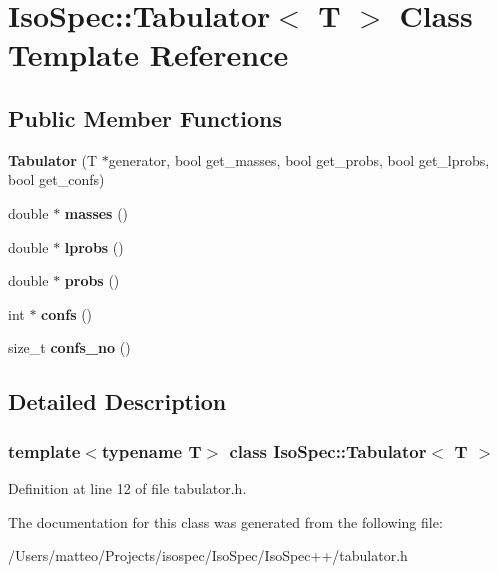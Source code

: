 \hypertarget{class_iso_spec_1_1_tabulator}{}\section{Iso\+Spec\+:\+:Tabulator$<$ T $>$ Class Template Reference}
\label{class_iso_spec_1_1_tabulator}
\subsection*{Public Member Functions}
\begin{DoxyCompactItemize}
\item 
\mbox{\label{class_iso_spec_1_1_tabulator_a57acb4ba7687ac95916c00fd9cd4f4c7}} 
{\bfseries Tabulator} (T $\ast$generator, bool get\+\_\+masses, bool get\+\_\+probs, bool get\+\_\+lprobs, bool get\+\_\+confs)
\item 
\mbox{\label{class_iso_spec_1_1_tabulator_ae256b348fc6c5d24d540c33094a37df9}} 
double $\ast$ {\bfseries masses} ()
\item 
\mbox{\label{class_iso_spec_1_1_tabulator_a486be3022d437b81b4932dd61ca4a0e5}} 
double $\ast$ {\bfseries lprobs} ()
\item 
\mbox{\label{class_iso_spec_1_1_tabulator_a0c572de1f59a3c664c55e55760be2f18}} 
double $\ast$ {\bfseries probs} ()
\item 
\mbox{\label{class_iso_spec_1_1_tabulator_a8000f897020376b6a03fb75dafb997f1}} 
int $\ast$ {\bfseries confs} ()
\item 
\mbox{\label{class_iso_spec_1_1_tabulator_acdbd459f1ec95dfd17cc0617cda02fba}} 
size\+\_\+t {\bfseries confs\+\_\+no} ()
\end{DoxyCompactItemize}


\subsection{Detailed Description}
\subsubsection*{template$<$typename T$>$\newline
class Iso\+Spec\+::\+Tabulator$<$ T $>$}



Definition at line 12 of file tabulator.\+h.



The documentation for this class was generated from the following file\+:\begin{DoxyCompactItemize}
\item 
/\+Users/matteo/\+Projects/isospec/\+Iso\+Spec/\+Iso\+Spec++/tabulator.\+h\end{DoxyCompactItemize}
